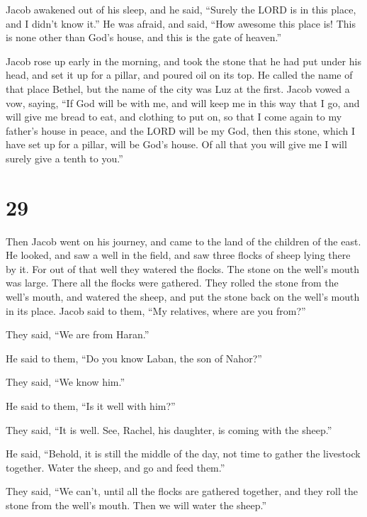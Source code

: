  Jacob awakened out of his sleep, and he said, ``Surely the
LORD is in this place, and I didn't know it.''  He was
afraid, and said, ``How awesome this place is! This is none other than
God's house, and this is the gate of heaven.''

 Jacob rose up early in the morning, and took the stone
that he had put under his head, and set it up for a pillar, and poured
oil on its top.  He called the name of that place Bethel,
but the name of the city was Luz at the first.  Jacob vowed
a vow, saying, ``If God will be with me, and will keep me in this way
that I go, and will give me bread to eat, and clothing to put on,
 so that I come again to my father's house in peace, and
the LORD will be my God,  then this stone, which I have set
up for a pillar, will be God's house. Of all that you will give me I
will surely give a tenth to you.''

\hypertarget{section-28}{%
\section{29}\label{section-28}}

 Then Jacob went on his journey, and came to the land of the
children of the east.  He looked, and saw a well in the
field, and saw three flocks of sheep lying there by it. For out of that
well they watered the flocks. The stone on the well's mouth was large.
 There all the flocks were gathered. They rolled the stone
from the well's mouth, and watered the sheep, and put the stone back on
the well's mouth in its place.  Jacob said to them, ``My
relatives, where are you from?''

They said, ``We are from Haran.''

 He said to them, ``Do you know Laban, the son of Nahor?''

They said, ``We know him.''

 He said to them, ``Is it well with him?''

They said, ``It is well. See, Rachel, his daughter, is coming with the
sheep.''

 He said, ``Behold, it is still the middle of the day, not
time to gather the livestock together. Water the sheep, and go and feed
them.''

 They said, ``We can't, until all the flocks are gathered
together, and they roll the stone from the well's mouth. Then we will
water the sheep.''

